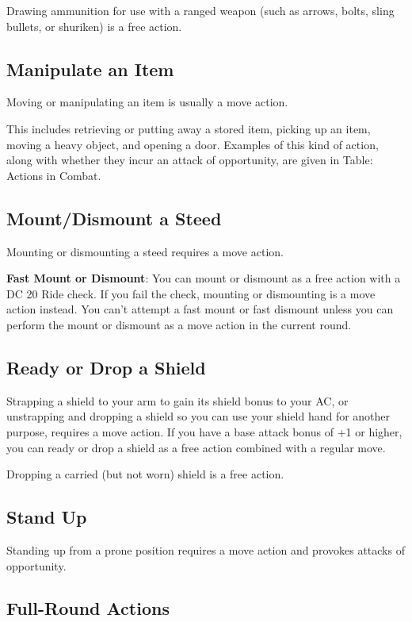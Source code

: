 Drawing ammunition for use with a ranged weapon (such as arrows, bolts, sling bullets, or shuriken) is a free action.
				
\subsection{Manipulate an Item}

				
Moving or manipulating an item is usually a move action.
				
This includes retrieving or putting away a stored item, picking up an item, moving a heavy object, and opening a door. Examples of this kind of action, along with whether they incur an attack of opportunity, are given in Table: Actions in Combat.
				
\subsection{Mount/Dismount a Steed}

				
Mounting or dismounting a steed requires a move action.
				
\textbf{Fast Mount or Dismount}: You can mount or dismount as a free action with a DC 20 Ride check. If you fail the check, mounting or dismounting is a move action instead. You can't attempt a fast mount or fast dismount unless you can perform the mount or dismount as a move action in the current round.
				
\subsection{Ready or Drop a Shield}

				
Strapping a shield to your arm to gain its shield bonus to your AC, or unstrapping and dropping a shield so you can use your shield hand for another purpose, requires a move action. If you have a base attack bonus of +1 or higher, you can ready or drop a shield as a free action combined with a regular move.
				
Dropping a carried (but not worn) shield is a free action.
				
\subsection{Stand Up}

				
Standing up from a prone position requires a move action and provokes attacks of opportunity.
				
\subsection{Full-Round Actions}

